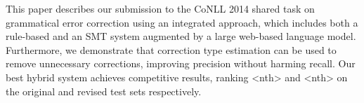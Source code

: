 This paper describes our submission to the CoNLL 2014 shared task on grammatical error correction using an integrated approach, which includes both a rule-based and an SMT system augmented by a large web-based language model. Furthermore, we demonstrate that correction type estimation can be used to remove unnecessary corrections, improving precision without harming recall. Our best hybrid system achieves competitive results, ranking <nth> and <nth> on the original and revised test sets respectively.
